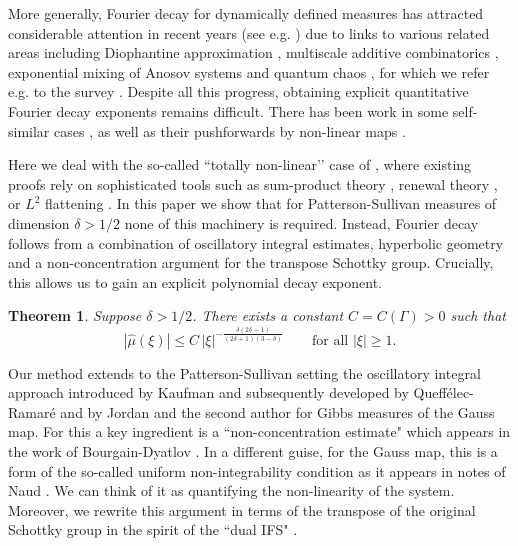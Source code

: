 \documentclass[12pt]{amsart}
\newcommand*\abs[1]{
	\left|#1\right|
}
\newtheorem{thm}{Theorem}
\theoremstyle{definition}
\begin{document}
More generally, Fourier decay for dynamically defined measures has attracted considerable attention in recent years (see e.g. \cite{AlgomChangWuWu,AlgomHertzWangLog,AlgomHertzWangPointwise,AlgomHertzWang,AlgomHertzWangPlane,Kaufman,Tsujii,SahlstenStevens,BakerSahlsten,BakerBanaji,LiSahlstenAffine,LiENS,LiSahlsten,LindenstraussVarju,VarjuYu,Rapaport,LeclercJulia,LeclercBunched,LeclercHyperbolic,LeclercOscillatory}) due to links to various related areas including Diophantine approximation \cite{PollingtonVelaniZafeiropoulosZorin}, multiscale additive combinatorics \cite{BD,SahlstenStevens,BakerSahlsten,LeclercPaukkonenSahlsten}, exponential mixing of Anosov systems \cite{LeclercFibonacci} and quantum chaos \cite{BD}, for which we refer e.g. to the survey \cite{Sahlsten}. Despite all this progress, obtaining explicit quantitative Fourier decay exponents remains difficult. There has been work in some self-similar cases \cite{Lee,BakerBanajiSlow}, as well as their pushforwards by non-linear maps \cite{BanajiYu}. 

Here we deal with the so-called ``totally non-linear’’ case of \cite{SahlstenStevens}, where existing proofs rely on sophisticated tools such as sum-product theory \cite{BD,Bourgain}, renewal theory \cite{LiStationary,AlgomHertzWang}, or $L^2$ flattening \cite{BKS,Khalil}. In this paper we show that for Patterson-Sullivan measures of dimension $\delta > 1/2$  none of this machinery is required. Instead, Fourier decay follows from a combination of oscillatory integral estimates, hyperbolic geometry and a non-concentration argument for the transpose Schottky group. Crucially, this allows us to gain an explicit polynomial decay exponent.

\begin{thm}\label{thm:main}
Suppose $\delta > 1/2$. There exists a constant $C = C(\Gamma) > 0$ such that
\[
\abs{\widehat{\mu}(\xi)}\le C\,\abs{\xi}^{-\frac{\delta(2\delta - 1)}{(2\delta + 1)(3 - \delta)}}\qquad\text{for all }\abs{\xi}\ge1.
\]
\end{thm}

Our method extends to the Patterson-Sullivan setting the oscillatory integral approach introduced by Kaufman \cite{Kaufman} and subsequently developed by Queff\'elec-Ramar\'e \cite{QueffelecRamare} and by Jordan and the second author \cite{JS} for Gibbs measures of the Gauss map. For this a key ingredient is a ``non-concentration estimate" which appears in the work of Bourgain-Dyatlov \cite{BD}. In a different guise, for the Gauss map, this is a form of the so-called uniform non-integrability condition as it appears in notes of Naud \cite{Naud}. We can think of it as quantifying the non-linearity of the system. Moreover, we rewrite this argument in terms of the transpose of the original Schottky group in the spirit of the ``dual IFS" \cite{BKT}.
\end{document}
